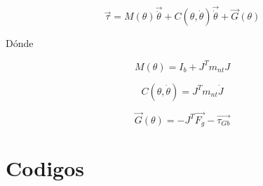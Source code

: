                  \[ \overrightarrow{ \tau}=M \left(  \theta  \right) \overrightarrow{\ddot{ \theta }}+C \left(  \theta ,\dot{ \theta } \right) \overrightarrow{\dot{ \theta }}+ \overrightarrow{G} \left(  \theta  \right)  \] 
                
                Dónde
                
                 \[ M \left(  \theta  \right) =I_{b}+J^{T} m_{nt} J \] 
                
                 \[ C \left(  \theta ,\dot{ \theta } \right) =J^{T} m_{nt}\dot{J} \] 
                
                 \[ \overrightarrow{G} \left(  \theta  \right) =- J^{T}\overrightarrow{F_{g}}-\overrightarrow{ \tau_{Gb}} \] 
         \newpage



        
\chapter{Codigos}\label{anexoC}
\thispagestyle{fancy}
    \section{}
        \subsection{}